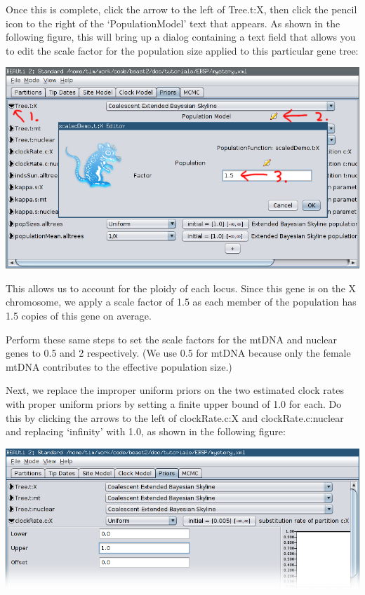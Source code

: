 \documentclass[a4paper,11pt]{article}
\begin{document}
Once this is complete, click the arrow to the left of Tree.t:X, then click the
pencil icon to the right of the `PopulationModel' text that appears. As shown
in the following figure, this will bring up a dialog containing a text
field that allows you to edit the scale factor for the population size applied
to this particular gene tree:

\includegraphics[width=\textwidth]{figures/ploidy.png}

This allows us to account for the ploidy of each locus. Since this gene is on
the X chromosome, we apply a scale factor of 1.5 as each member of the
population has 1.5 copies of this gene on average.

Perform these same steps to set the scale factors for the mtDNA and nuclear
genes to 0.5 and 2 respectively. (We use 0.5 for mtDNA because only the female
mtDNA contributes to the effective population size.)

Next, we replace the improper uniform priors on the two estimated clock rates
with proper uniform priors by setting a finite upper bound of 1.0 for each.  Do
this by clicking the arrows to the left of clockRate.c:X and
clockRate.c:nuclear and replacing `infinity' with 1.0, as shown in
the following figure:

\includegraphics[width=\textwidth]{figures/clockrate_prior.png}
\end{document}

